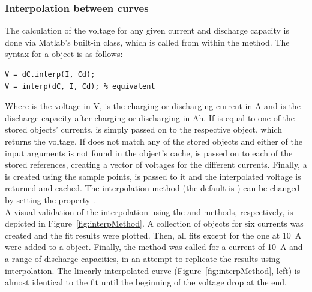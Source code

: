 \subsubsection{Interpolation between curves}
The calculation of the voltage for any given current and discharge capacity is done via Matlab's built-in  class, which is called from within the  method. The syntax for a  object  is as follows:
\begin{lstlisting}
V = dC.interp(I, Cd);
V = interp(dC, I, Cd); % equivalent
\end{lstlisting}
Where  is the voltage in V,  is the charging or discharging current in A and  is the discharge capacity after charging or discharging in Ah. If  is equal to one of the stored  objects' currents,  is simply passed on to the respective object, which returns the voltage. If  does not match any of the stored objects and either of the input arguments is not found in the object's cache,  is passed on to each of the stored  references, creating a vector of voltages for the different currents. Finally, a  is created using the sample points,  is passed to it and the interpolated voltage is returned and cached. The interpolation method (the default is ) can be changed by setting the property . \\
A visual validation of the interpolation using the  and  methods, respectively, is depicted in Figure~\ref{fig:interpMethod}. A collection of  objects for six currents was created and the fit results were plotted. Then, all fits except for the one at 10~A were added to a  object. Finally, the  method was called for a current of 10~A and a range of discharge capacities, in an attempt to replicate the  results using interpolation. The linearly interpolated curve (Figure~\ref{fig:interpMethod}, left) is almost identical to the fit until the beginning of the voltage drop at the end. 

